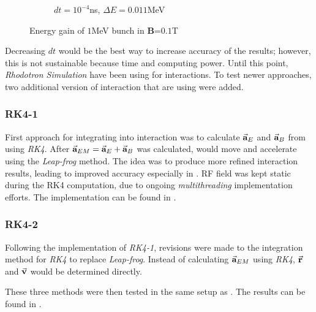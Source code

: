 \documentclass[a4paper,oneside,12pt]{report}
\numberwithin{equation}{chapter}
\begin{document}
\begin{figure}[H]
\begin{subfigure}{0.8\textwidth}
        \caption*{$dt=10^{-4}$ns, $\Delta E=0.011$MeV}
    \end{subfigure}
    \caption{Energy gain of $1$MeV bunch in \textbf{B}=$0.1$T}
    \label{fig:mag_lf_render}
\end{figure}

Decreasing $dt$ would be the best way to increase accuracy of the results; however, this is not sustainable because time and computing power. 
Until this point, \textit{Rhodotron Simulation} have been using  for \eEM interactions. 
To test newer approaches, two additional version of  \eEM interaction that are using  were added.
\subsubsection{RK4-1}
First approach for integrating  into \eEM interaction was to calculate $\vec{\textbf{a}}_{E}$ and $\vec{\textbf{a}}_{B}$ from  using \textit{RK4}.
After $\vec{\textbf{a}}_{EM} = \vec{\textbf{a}}_{E} + \vec{\textbf{a}}_{B}$ was calculated, \e would move and accelerate using the \textit{Leap-frog} method. 
The idea was to produce more refined interaction results, leading to improved accuracy especially in \eB.
RF field was kept static during the RK4 computation, due to ongoing \textit{multithreading} implementation efforts. 
The implementation can be found in .
\subsubsection{RK4-2}
Following the implementation of \textit{RK4-1}, revisions were made to the integration method for \textit{RK4} to replace \textit{Leap-frog}.
Instead of calculating $\vec{\textbf{a}}_{EM}$ using \textit{RK4}, $\vec{\textbf{r}}$ and $\vec{\textbf{v}}$ would be determined directly.

These three methods were then tested in the same setup as . The results can be found in .
\end{document}
